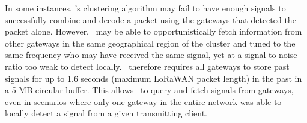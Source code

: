  In some instances, \name's clustering algorithm may fail to have enough signals to successfully combine and decode a packet using the gateways that detected the packet alone. However, \name\ may be able to opportunistically fetch information from other gateways in the same geographical region of the cluster and tuned to the same frequency who may have received the same signal, yet at a signal-to-noise ratio too weak to detect locally. \name\ therefore requires all gateways to store past signals for up to 1.6 seconds (maximum LoRaWAN packet length) in the past in a 5 MB circular buffer. This allows \name\ to query and fetch signals from gateways, even in scenarios where only one gateway in the entire network was able to locally detect a signal from a given transmitting client. 




